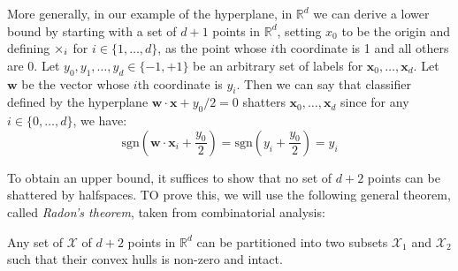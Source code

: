 More generally, in our example of the hyperplane, in $\mathbb{R}^{d}$ we can derive a lower bound by starting with a set of $d+1$ points in $\mathbb{R}^{d}$, setting $x_{0}$ to be the origin and defining $\times_{i}$ for $i\in \{1,\dots,d\}$, as the point whose $i$th coordinate is 1 and all others are 0. Let $y_{0},y_{1},\dots,y_{d}\in \{-1,+1\}$ be an arbitrary set of labels for $\mathbf{x}_{0},\dots,\mathbf{x}_{d}$. Let $\mathbf{w}$ be the vector whose $i$th coordinate is $y_{i}$. Then we can say that classifier defined by the hyperplane $\mathbf{w}\cdot \mathbf{x}+ y_{0}/2=0$ shatters $\mathbf{x}_0,\dots,\mathbf{x}_{d}$ since for any $i\in \{0,\dots,d\}$, we have: 
\begin{equation}
    \mathrm{sgn}\left(\mathbf{w}\cdot \mathbf{x}_{i} + \frac{y_0}{2}\right) = \mathrm{sgn}\left(y_{i}+ \frac{y_{0}}{2}\right) = y_{i}
\end{equation}

To obtain an upper bound, it suffices to show that no set of $d+2$ points can be shattered by halfspaces. TO prove this, we will use the following general theorem, called \textit{Radon's theorem}, taken from combinatorial analysis: 
\begin{theorem}
    Any set of $\mathcal{X}$ of $d+2$ points in $\mathbb{R}^{d}$ can be partitioned into two subsets $\mathcal{X}_{1}$ and $\mathcal{X}_{2}$ such that their convex hulls is non-zero and intact. 
\end{theorem}
